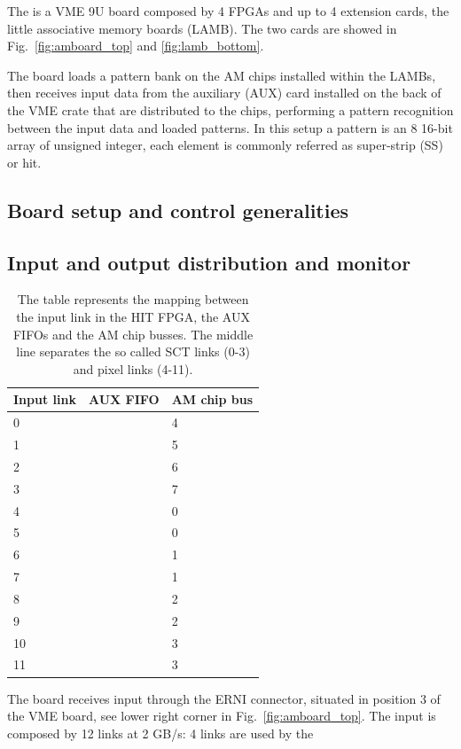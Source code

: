 The \AMBoard is a VME 9U board composed by 4 FPGAs and up to 4 extension cards,
the little associative memory boards (LAMB). The two cards are showed in 
Fig.~\ref{fig:amboard_top} and \ref{fig:lamb_bottom}.

The board loads a pattern
bank on the AM chips installed within the LAMBs, then receives input data
from the auxiliary (AUX) card installed on the back of the VME crate that are
distributed to the chips, performing a pattern recognition between the 
input data and loaded patterns. In this setup a pattern is an 8 16-bit array
of unsigned integer, each element is commonly referred as super-strip (SS)
or hit. 

\subsection{Board setup and control generalities}

\subsection{Input and output distribution and monitor}

\begin{table}
	\centering
	\begin{tabular}{|l|l|l|}
	\hline\hline
	\textbf{Input link} & \textbf{AUX FIFO}& \textbf{AM chip bus} \\
	\hline\hline
	0 & & 4 \\ 
	1 & & 5 \\ 
	2 & & 6 \\ 
	3 & & 7 \\
	\hline
	4 & & 0 \\
	5 & & 0 \\
	6 & & 1 \\
	7 & & 1 \\
	8 & & 2 \\
	9 & & 2 \\
	10 & & 3 \\
	11 & & 3 \\
	\hline
\end{tabular}

\caption{The table represents the mapping between the input link
	in the HIT FPGA, the AUX FIFOs and the AM chip busses. The middle line
	separates the so called SCT links (0-3) and pixel links (4-11).}
\label{tab:inputmap}
\end{table}
The board receives input through the ERNI connector, situated in position 3 of the
VME board, see lower right corner in Fig.~\ref{fig:amboard_top}. The input
is composed by 12 links at 2 GB/s: 4 links are used by the 

